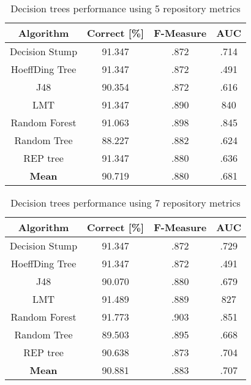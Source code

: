 \begin{table}[h!]		
\centering		
\begin{tabular}{ |c|c|c|c| } 		
 \hline		
 \textbf{Algorithm} & \textbf{Correct [\%]} & \textbf{F-Measure} & \textbf{AUC}  \\ 		
 \hline		
 Decision Stump & 91.347 & .872 & .714    \\ 		
 \hline		
 HoeffDing Tree &  91.347 & .872 & .491   \\ 		
 \hline		
  J48 & 90.354 & .872 & .616\\ 		
 \hline		
  LMT & 91.347 & .890 & 840  \\ 		
 \hline		
  Random Forest & 91.063 & .898 & .845 \\ 		
 \hline		
  Random Tree & 88.227 & .882 & .624 \\ 		
 \hline		
 REP tree  & 91.347 & .880 & .636 \\ 		
 \hline	
 \textbf{Mean}  & 90.719 & .880 & .681 \\ 		
 \hline	
		
\end{tabular}		
\caption{Decision trees performance using 5 repository metrics}		
\label{table:DT_5}		
\end{table}

\begin{table}[h!]		
\centering		
\begin{tabular}{ |c|c|c|c| } 		
 \hline		
 \textbf{Algorithm} & \textbf{Correct [\%]} & \textbf{F-Measure} & \textbf{AUC}  \\ 		
 \hline		
 Decision Stump & 91.347 & .872 & .729    \\ 		
 \hline		
 HoeffDing Tree &  91.347 & .872 & .491   \\ 		
 \hline		
  J48 & 90.070 & .880 & .679\\ 		
 \hline		
  LMT & 91.489 & .889 & 827  \\ 		
 \hline		
  Random Forest & 91.773 & .903 & .851 \\ 		
 \hline		
  Random Tree & 89.503 & .895 & .668 \\ 		
 \hline		
 REP tree  & 90.638 & .873 & .704 \\ 		
 \hline		
 \textbf{Mean}  & 90.881 & .883 & .707 \\ 		
 \hline
		
\end{tabular}		
\caption{Decision trees performance using 7 repository metrics}		
\label{table:DT_7}		
\end{table}



